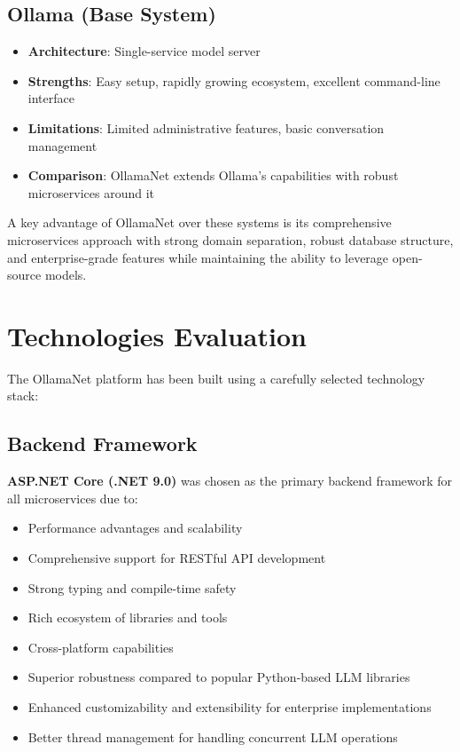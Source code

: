 \subsection*{Ollama (Base System)}
\begin{itemize}
    \item \textbf{Architecture}: Single-service model server
    \item \textbf{Strengths}: Easy setup, rapidly growing ecosystem, excellent command-line interface
    \item \textbf{Limitations}: Limited administrative features, basic conversation management
    \item \textbf{Comparison}: OllamaNet extends Ollama's capabilities with robust microservices around it
\end{itemize}

A key advantage of OllamaNet over these systems is its comprehensive microservices approach with strong domain separation, robust database structure, and enterprise-grade features while maintaining the ability to leverage open-source models.

\section{Technologies Evaluation}

The OllamaNet platform has been built using a carefully selected technology stack:

\subsection*{Backend Framework}

\textbf{ASP.NET Core (.NET 9.0)} was chosen as the primary backend framework for all microservices due to:
\begin{itemize}
    \item Performance advantages and scalability
    \item Comprehensive support for RESTful API development
    \item Strong typing and compile-time safety
    \item Rich ecosystem of libraries and tools
    \item Cross-platform capabilities
    \item Superior robustness compared to popular Python-based LLM libraries
    \item Enhanced customizability and extensibility for enterprise implementations
    \item Better thread management for handling concurrent LLM operations
\end{itemize}

